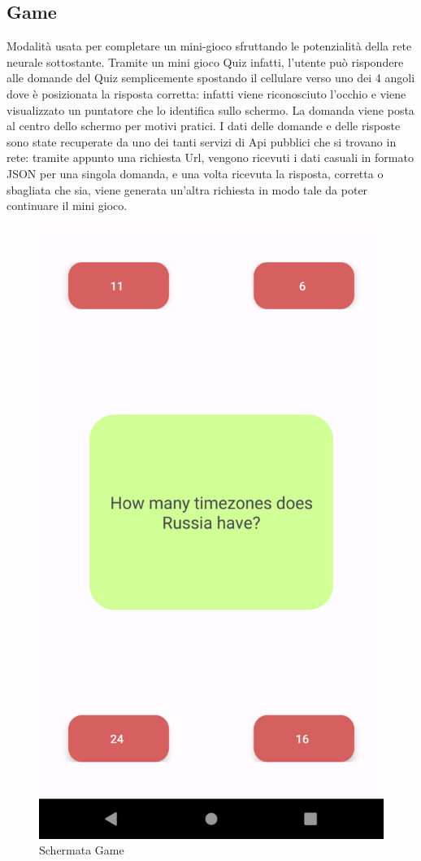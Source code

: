 \documentclass[11pt]{article}
\begin{document}
\subsection{Game}
Modalità usata per completare un mini-gioco sfruttando le potenzialità della rete neurale sottostante. Tramite un mini gioco Quiz infatti, l'utente può rispondere alle domande del Quiz semplicemente spostando il cellulare verso uno dei 4 angoli dove è posizionata la risposta corretta: infatti viene riconosciuto l'occhio e viene visualizzato un puntatore che lo identifica sullo schermo. La domanda viene posta al centro dello schermo per motivi pratici.
\newline
I dati delle domande e delle risposte sono state recuperate da uno dei tanti servizi di Api pubblici che si trovano in rete: tramite appunto una richiesta Url, vengono ricevuti i dati casuali in formato JSON per una singola domanda, e una volta ricevuta la risposta, corretta o sbagliata che sia, viene generata un'altra richiesta in modo tale da poter continuare il mini gioco. 
\begin{figure}[h]
	\centering
	\caption{Schermata Game}
	\includegraphics[scale=0.2]{img/game.png}
\end{figure}
\end{document}
